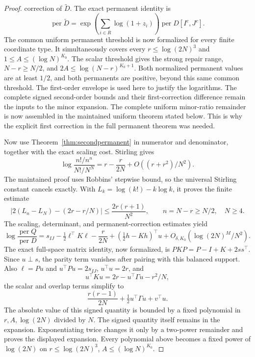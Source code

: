 \begin{proof}
correction of \(\widetilde D\). The exact permanent identity is
\[
 \operatorname{per}\widetilde D
 =\exp\!\left(\sum_{i\in R}\log(1+z_i)\right)
   \operatorname{per}D[I^c,J^c].
\]
The common uniform permanent threshold is now formalized for every
finite coordinate type. It simultaneously covers every
\(r\leq\log(2N)^3\) and \(1\leq A\leq(\log N)^{K_0}\).
The scalar threshold gives the strong repair range,
\(N-r\geq N/2\), and \(2A\leq\log(N-r)^{K_0+1}\).
Both normalized permanent values are at least \(1/2\), and both
permanents are positive, beyond this same common threshold.
The first-order envelope is used here to justify the logarithms.
The complete signed second-order bounds and their first-correction
difference remain the inputs to the minor expansion. The complete
uniform minor-ratio remainder is now assembled in the maintained
uniform theorem stated below.
This is why the explicit first correction in the full permanent
theorem was needed.

Now use Theorem~\ref{thm:secondpermanent} in numerator
and denominator, together with the exact scaling cost.
Stirling gives
\[
 \log\frac{n!/n^n}{N!/N^N}
       =r-\frac r{2N}+O((r+r^2)/N^2).
\]
The maintained proof uses Robbins' stepwise bound, so the universal
Stirling constant cancels exactly. With
\(L_k=\log(k!)-k\log k\), it proves the finite estimate
\[
 |2(L_n-L_N)-(2r-r/N)|\leq\frac{2r(r+1)}{N^2},
 \qquad n=N-r\geq N/2,\quad N\geq4.
\]
The scaling, determinant, and permanent-correction estimates yield
\[
 \log\frac{\operatorname{per}Q}{\operatorname{per}D}
 =s_{IJ}-\tfrac12\ell^\top K\ell-\frac r{2N}
           +(\tfrac12h-Kh)^\top u
           +O_{\delta,K_0}(\log(2N)^M/N^2).
\]
The exact full-space matrix identity, now formalized, is
\(PKP=P-I+K+2ss^\top\). Since \(u\perp s\), the parity
term vanishes after pairing with this balanced support. Also
\(\ell=Pu\) and \(u^\top Pu=2s_{IJ}\),
\(u^\top u=2r\), and
\[
 u^\top Ku=2r-u^\top\Gamma u-r^2/N,
\]
the scalar and overlap terms simplify to
\[
 \frac{r(r-1)}{2N}+\tfrac12u^\top\Gamma u+v^\top u.
\]
The absolute value of this signed quantity is bounded by a fixed
polynomial in \(r,A,\log(2N)\) divided by \(N\).
The signed quantity itself remains in the expansion.
Exponentiating twice changes it only by
a two-power remainder and proves the displayed expansion.
Every polynomial above becomes a fixed power of \(\log(2N)\)
on \(r\leq\log(2N)^3\), \(A\leq(\log N)^{K_0}\).
\end{proof}


